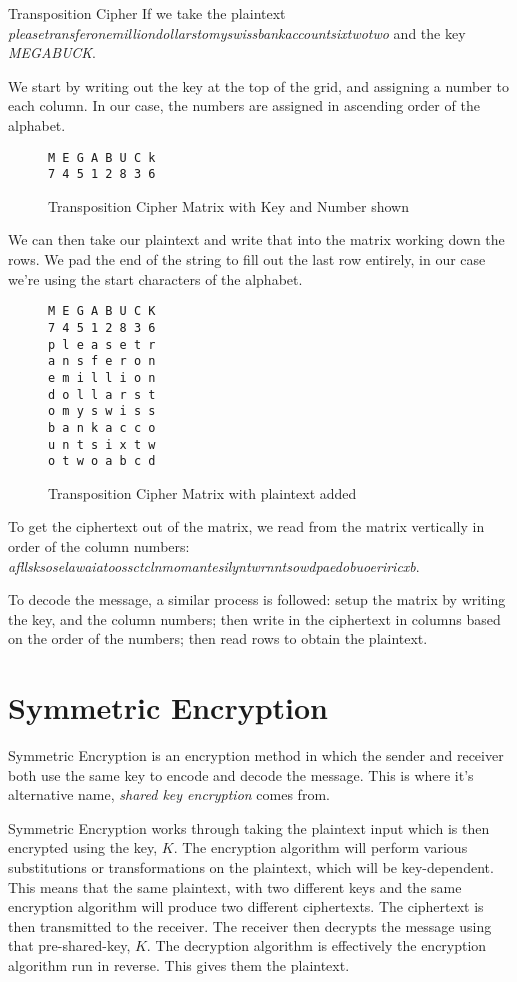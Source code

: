\begin{example}{Transposition Cipher}
If we take the plaintext \textit{pleasetransferonemilliondollarstomyswissbankaccountsixtwotwo} and the key \textit{MEGABUCK}. 

We start by writing out the key at the top of the grid, and assigning a number to each column. In our case, the numbers are assigned in ascending order of the alphabet.

\begin{figure}[H]
\centering
\begin{BVerbatim}
M E G A B U C k
7 4 5 1 2 8 3 6
\end{BVerbatim}
\caption{Transposition Cipher Matrix with Key and Number shown}
\end{figure}

We can then take our plaintext and write that into the matrix working down the rows. We pad the end of the string to fill out the last row entirely, in our case we're using the start characters of the alphabet.

\begin{figure}[H]
\centering
\begin{BVerbatim}
M E G A B U C K
7 4 5 1 2 8 3 6
p l e a s e t r
a n s f e r o n
e m i l l i o n
d o l l a r s t
o m y s w i s s
b a n k a c c o
u n t s i x t w
o t w o a b c d
\end{BVerbatim}
\caption{Transposition Cipher Matrix with plaintext added}
\end{figure}

To get the ciphertext out of the matrix, we read from the matrix vertically in order of the column numbers: \textit{afllsksoselawaiatoossctclnmomantesilyntwrnntsowdpaedobuoeriricxb}. 

To decode the message, a similar process is followed: setup the matrix by writing the key, and the column numbers; then write in the ciphertext in columns based on the order of the numbers; then read rows to obtain the plaintext.
\end{example}

\section{Symmetric Encryption}
Symmetric Encryption is an encryption method in which the sender and receiver both use the same key to encode and decode the message. This is where it's alternative name, \textit{shared key encryption} comes from. 

Symmetric Encryption works through taking the plaintext input which is then encrypted using the key, $K$. The encryption algorithm will perform various substitutions or transformations on the plaintext, which will be key-dependent. This means that the same plaintext, with two different keys and the same encryption algorithm will produce two different ciphertexts. The ciphertext is then transmitted to the receiver. The receiver then decrypts the message using that pre-shared-key, $K$. The decryption algorithm is effectively the encryption algorithm run in reverse. This gives them the plaintext. 

